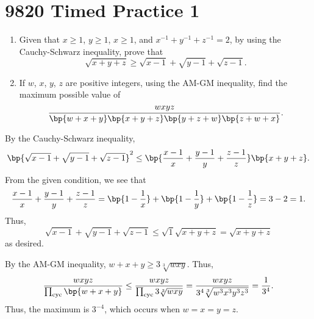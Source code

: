 \section{9820 Timed Practice 1}

\begin{problem}
    \begin{enumerate}
        \item Given that $x \geq 1$, $y \geq 1$, $x \geq 1$, and $x^{-1} + y^{-1} + z^{-1} = 2$, by using the Cauchy-Schwarz inequality, prove that \[\sqrt{x + y + z} \geq \sqrt{x-1} + \sqrt{y-1} + \sqrt{z-1}.\]
        \item If $w$, $x$, $y$, $z$ are positive integers, using the AM-GM inequality, find the maximum possible value of \[\frac{wxyz}{\bp{w + x + y} \bp{x + y + z} \bp{y + z + w} \bp{z + w + x}}.\]
    \end{enumerate}
\end{problem}
\begin{solution}
    \begin{ppart}
        By the Cauchy-Schwarz inequality, \[\bp{\sqrt{x-1} + \sqrt{y-1} + \sqrt{z-1}}^2 \leq \bp{\frac{x-1}{x} + \frac{y-1}{y} + \frac{z-1}{z}}\bp{x + y + z}.\] From the given condition, we see that \[\frac{x-1}{x} + \frac{y-1}{y} + \frac{z-1}{z} = \bp{1 - \frac1x} + \bp{1 - \frac1y} + \bp{1 - \frac1z} = 3 - 2 = 1.\] Thus, \[\sqrt{x-1} + \sqrt{y-1} + \sqrt{z-1} \leq \sqrt{1} \sqrt{x + y + z} = \sqrt{x + y + z}\] as desired.
    \end{ppart}
    \begin{ppart}
        By the AM-GM inequality, $w + x + y \geq 3 \sqrt[3]{wxy}$. Thus, \[\frac{wxyz}{\prod_{\text{cyc}} \bp{w + x + y}} \leq \frac{wxyz}{\prod_{\text{cyc}} 3\sqrt[3]{wxy}} = \frac{wxyz}{3^4 \sqrt[3]{w^3 x^3 y^3 z^3}} = \frac1{3^4}.\] Thus, the maximum is $3^{-4}$, which occurs when $w = x = y = z$.
    \end{ppart}
\end{solution}

